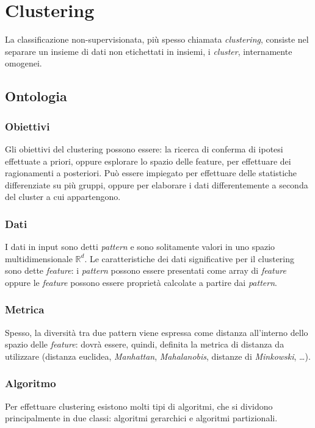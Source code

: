 \documentclass[\main/main.tex]{subfiles}
\begin{document}
\providecommand{\graffe}[1]{\left\lbrace #1 \right\rbrace}

\section{Clustering}
La classificazione non-supervisionata, più spesso chiamata \textit{clustering}, consiste nel separare un insieme di dati non etichettati in insiemi, i \textit{cluster}, internamente omogenei.
\subsection{Ontologia}
\subsubsection{Obiettivi}
Gli obiettivi del clustering possono essere: la ricerca di conferma di ipotesi effettuate a priori, oppure esplorare lo spazio delle feature, per effettuare dei ragionamenti a posteriori. Può essere impiegato per effettuare delle statistiche differenziate su più gruppi, oppure per elaborare i dati differentemente a seconda del cluster a cui appartengono.
\subsubsection{Dati}
I dati in input sono detti \textit{pattern} e sono solitamente valori in uno spazio multidimensionale $\mathbb{R}^d$. Le caratteristiche dei dati significative per il clustering sono dette \textit{feature}: i \textit{pattern} possono essere presentati come array di \textit{feature} oppure le \textit{feature} possono essere proprietà calcolate a partire dai \textit{pattern}.
\subsubsection{Metrica}
Spesso, la diversità tra due pattern viene espressa come distanza all'interno dello spazio delle \textit{feature}: dovrà essere, quindi, definita la metrica di distanza da utilizzare (distanza euclidea, \textit{Manhattan}, \textit{Mahalanobis}, distanze di \textit{Minkowski}, \dots ).

\subsubsection{Algoritmo}
Per effettuare clustering esistono molti tipi di algoritmi, che si dividono principalmente in due classi: algoritmi gerarchici e algoritmi partizionali.
\end{document}
